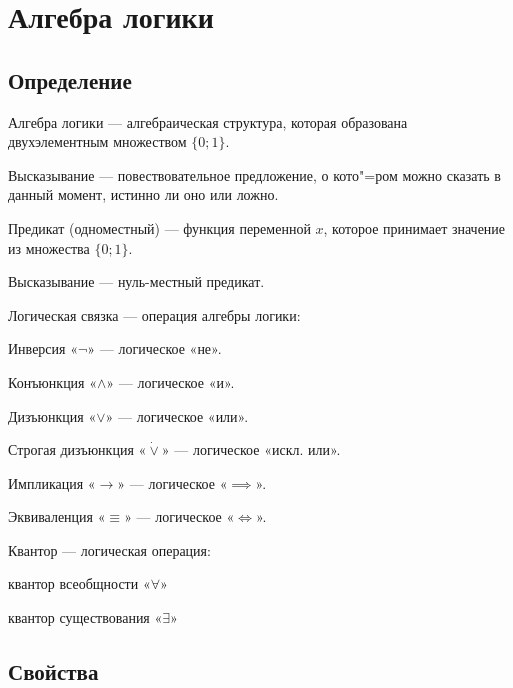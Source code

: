 \section{Алгебра логики}

\subsection{Определение}

{\bold Алгебра логики} --- алгебраическая структура, которая образована двухэлементным множеством $\{0;1\}$.

{\bold Высказывание} --- повествовательное предложение, о кото"=ром можно сказать в данный момент, {\ital истинно} ли оно или {\ital ложно}.

{\bold Предикат} {\ital (одноместный)} --- функция переменной $x$, которое принимает значение из множества $\{0;1\}$.

\begin{theorem}
Высказывание --- {\ital нуль-}местный предикат.
\end{theorem} 

{\bold Логическая связка} --- операция алгебры логики:
\begin{list*}[][\#]
\item{\ital Инверсия} «$\lnot$» --- логическое {\ital «не»}.
\item{\ital Конъюнкция} «$\land$» --- логическое {\ital «и»}.
\item{\ital Дизъюнкция} «$\lor$» --- логическое {\ital «или»}.
\item{\ital Строгая дизъюнкция} «$\dot{\lor}$» --- логическое {\ital «искл. или»}.
\item{\ital Импликация} «$\rightarrow$» --- логическое {\ital «$\implies$»}.
\item{\ital Эквиваленция} «$\equiv$» --- логическое {\ital «$\iff$»}.
\end{list*}

{\bold Квантор} --- логическая операция:
\begin{list*}
\item{\ital квантор всеобщности} «$\forall$»
\item{\ital квантор существования} «$\exists$»
\end{list*}

\subsection{Свойства}

